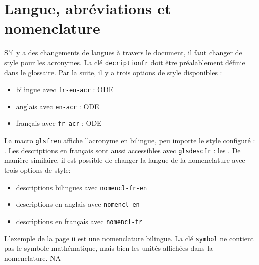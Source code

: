 \documentclass[PhD,nohyperref,english,french]{ulthese}
\begin{document}
\section{Langue, abréviations et nomenclature}

S'il y a des changements de langues à travers le document, il faut changer de style pour les acronymes. La clé \texttt{decriptionfr} doit être préalablement définie dans le glossaire. Par la suite, il y a trois options de style disponibles : 
\begin{itemize}
	 \item bilingue  avec \texttt{fr-en-acr}  : \acrfull{ODE}
	 \item anglais avec \texttt{en-acr} : \acrfull{ODE}
	  \item français avec \texttt{fr-acr} : \acrfull{ODE}
\end{itemize}
La macro \texttt{glsfren} affiche l'acronyme en bilingue, peu importe le style configuré : . Les descriptions en français sont aussi accessibles avec \texttt{glsdescfr} : les . De manière similaire, il est possible de changer la langue de la nomenclature avec trois options de style:
\begin{itemize}
	\item descriptions bilingues avec \texttt{nomencl-fr-en}
	\item descriptions en anglais avec \texttt{nomencl-en}
	\item descriptions en français avec \texttt{nomencl-fr}
\end{itemize}
L'exemple de la page ii est une nomenclature bilingue. La clé \texttt{symbol} ne contient pas le symbole mathématique, mais bien les unités affichées dans la nomenclature. \gls{NA}
\end{document}
